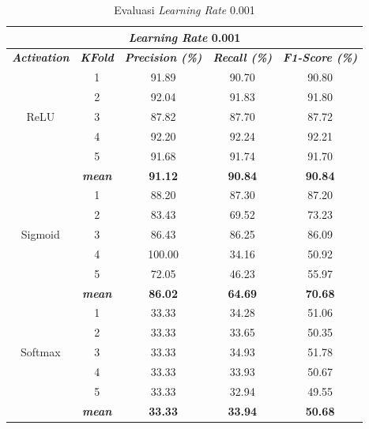 \begin{table}[H]
    
    
    

   

    \begin{table}[H]
        \centering
        \caption{Evaluasi \textit{Learning Rate} 0.001 }
        \begin{tabular}{ccccc}
            \toprule
            \multicolumn{5}{c}{\textit{Learning Rate} 0.001} \\ \hline
            
            \textbf{\textit{Activation}} & \multicolumn{1}{c}{\textbf{\textit{KFold}}} & \textbf{\textit{Precision (\%)} } & \textbf{\textit{Recall (\%)}} & \textbf{\textit{F1-Score (\%)}}  \\
    
            \midrule
            \multirow{5}{*}{ReLU} 

            & 1 & 91.89 & 90.70 & 90.80  \\
            & 2 & 92.04 & 91.83 & 91.80 \\
            & 3 & 87.82 & 87.70 & 87.72\\
            & 4 & 92.20 & 92.24 & 92.21\\
            & 5 & 91.68 & 91.74 & 91.70 \\
            & \textit{\textbf{mean }} & \textbf{91.12} & \textbf{90.84} & \textbf{90.84 }\\ \hline

            
            \multirow{5}{*}{Sigmoid}
            & 1 & 88.20 & 87.30 & 87.20  \\
            & 2 & 83.43 & 69.52 & 73.23 \\
            & 3 & 86.43 & 86.25 & 86.09 \\
            & 4 & 100.00 & 34.16 & 50.92 \\
            & 5 & 72.05 & 46.23 & 55.97 \\
            & \textit{\textbf{mean}}& \textbf{86.02} & \textbf{64.69} &\textbf{70.68} \\ 
                        \hline
    
            \multirow{5}{*}{Softmax}
            & 1 & 33.33  & 34.28 & 51.06 \\
            & 2 & 33.33  & 33.65 & 50.35 \\
            & 3 & 33.33  & 34.93 & 51.78  \\
            & 4 & 33.33  & 33.93 & 50.67 \\
            & 5 & 33.33  & 32.94 & 49.55 \\
            & \textit{\textbf{mean}}& \textbf{33.33} & \textbf{33.94} &\textbf{50.68} \\ 
    


\end{tabular}
\end{table}
\end{table}
